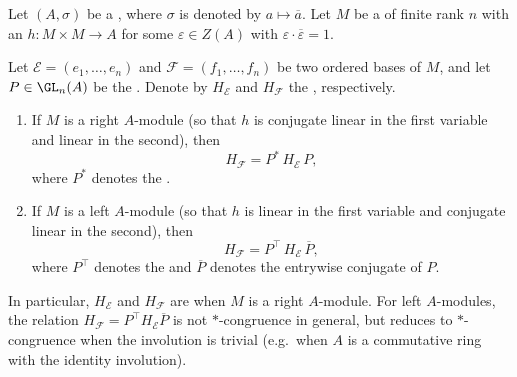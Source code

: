 \begin{lemma} \label{lemma:change_of_basis_for_matrix_of_an_epsilon_hermitian_form_on_a_free_module_over_a_ring_with_involution}
    Let $(A,\sigma)$ be a , where $\sigma$ is denoted by $a \mapsto \overline{a}$. Let $M$ be a  of finite rank $n$ with an  $h: M \times M \to A$ for some $\varepsilon \in Z(A)$ with $\varepsilon \cdot \overline{\varepsilon} = 1$.

    Let $\mathcal{E} = (e_1,\ldots,e_n)$ and $\mathcal{F} = (f_1,\ldots,f_n)$ be two ordered bases of $M$, and let $P \in \GL_n(A)$ be the . Denote by $H_\mathcal{E}$ and $H_\mathcal{F}$ the , respectively.

    \begin{enumerate}
        \item If $M$ is a right $A$-module (so that $h$ is conjugate linear in the first variable and linear in the second), then
        $$H_\mathcal{F} = P^* \, H_\mathcal{E} \, P,$$
        where $P^*$ denotes the .

        \item If $M$ is a left $A$-module (so that $h$ is linear in the first variable and conjugate linear in the second), then
        $$H_\mathcal{F} = P^\top \, H_\mathcal{E} \, \overline{P},$$
        where $P^\top$ denotes the  and $\overline{P}$ denotes the entrywise conjugate of $P$.
    \end{enumerate}

    In particular, $H_\mathcal{E}$ and $H_\mathcal{F}$ are  when $M$ is a right $A$-module. For left $A$-modules, the relation $H_\mathcal{F} = P^\top H_\mathcal{E} \overline{P}$ is not $*$-congruence in general, but reduces to $*$-congruence when the involution is trivial (e.g.\ when $A$ is a commutative ring with the identity involution).
\end{lemma}
